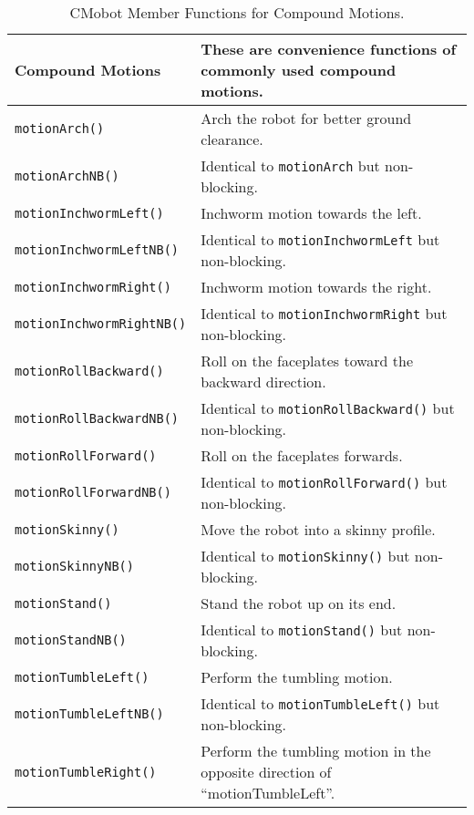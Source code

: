 \begin{table}[!h]
\begin{center}
\caption{CMobot Member Functions for Compound Motions.}
\begin{tabular}{p{38 mm}p{107 mm}}
Compound Motions & These are convenience functions of commonly used compound motions. \\
\hline
\texttt{motionArch()} \dotfill & Arch the robot for better ground clearance. \\
\texttt{motionArchNB()} \dotfill & Identical to \texttt{motionArch} but non-blocking. \\
\texttt{motionInchwormLeft()} \dotfill & Inchworm motion towards the left. \\
\texttt{motionInchwormLeftNB()} \dotfill & Identical to \texttt{motionInchwormLeft} but non-blocking. \\
\texttt{motionInchwormRight()} \dotfill & Inchworm motion towards the right. \\
\texttt{motionInchwormRightNB()} \dotfill & Identical to \texttt{motionInchwormRight} but non-blocking. \\
\texttt{motionRollBackward()} \dotfill & Roll on the faceplates toward the backward direction. \\
\texttt{motionRollBackwardNB()} \dotfill & Identical to \texttt{motionRollBackward()} but non-blocking. \\
\texttt{motionRollForward()} \dotfill & Roll on the faceplates forwards. \\
\texttt{motionRollForwardNB()} \dotfill & Identical to \texttt{motionRollForward()} but non-blocking. \\
\texttt{motionSkinny()} \dotfill & Move the robot into a skinny profile. \\
\texttt{motionSkinnyNB()} \dotfill & Identical to \texttt{motionSkinny()} but non-blocking. \\
\texttt{motionStand()} \dotfill & Stand the robot up on its end. \\
\texttt{motionStandNB()} \dotfill & Identical to \texttt{motionStand()} but non-blocking. \\
\texttt{motionTumbleLeft()} \dotfill & Perform the tumbling motion. \\
\texttt{motionTumbleLeftNB()} \dotfill & Identical to \texttt{motionTumbleLeft()} but non-blocking. \\
\texttt{motionTumbleRight()} \dotfill & Perform the tumbling motion in the opposite direction of ``motionTumbleLeft''. \\

\end{tabular}
\end{center}
\end{table}
